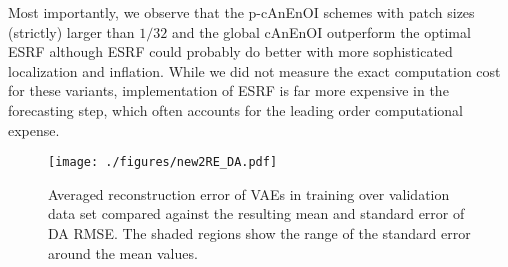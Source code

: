 \documentclass[final,3p]{elsarticle}
\theoremstyle{break}
\begin{document}
Most importantly, we observe that the p-cAnEnOI schemes with patch sizes (strictly) larger than $1/32$ and the global cAnEnOI outperform the optimal ESRF although ESRF could probably do better with more sophisticated localization and inflation.
While we did not measure the exact computation cost for these variants, implementation of ESRF is far more expensive in the forecasting step, which often accounts for the leading order computational expense.
\begin{figure}[h]
	\centering
	\texttt{[image: ./figures/new2RE\_DA.pdf]}
	\caption{\label{fig:re_da} Averaged reconstruction error of VAEs in training over validation data set compared against the resulting mean and standard error of DA RMSE. The shaded regions show the range of the standard error around the mean values.}
\end{figure} 
\end{document}
